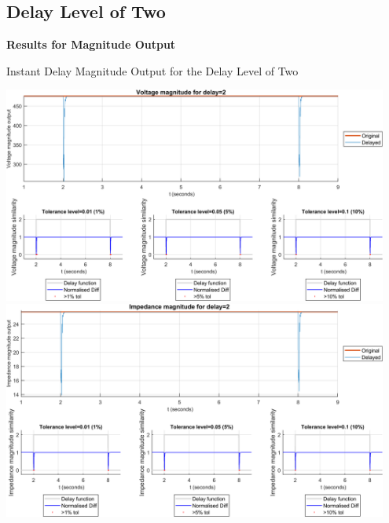 \newpage \subsection{Delay Level of Two}
\textbf{Results for Magnitude Output}
\begin{floatingfigure}[p]{\textwidth}
    \caption{Instant Delay Magnitude Output for the Delay Level of Two}
    \includegraphics[width=0.95\textwidth]{PMUsim-figures/DelayOf_2/Instant_vMagnitude.png}    
      \includegraphics[width=0.95\textwidth]{PMUsim-figures/DelayOf_2/Instant_iMagnitude.png}
    \label{fig:PMUsim_Two_Magnitude}
\end{floatingfigure}
    \begin{small}
     \end{small}

